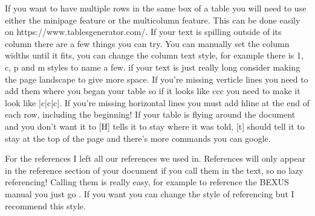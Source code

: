 %

If you want to have multiple rows in the same box of a table you will need to use either the minipage feature or the multicolumn feature. This can be done easily on  https://www.tablesgenerator.com/. If your text is spilling outside of its column there are a few things you can try. You can manually set the column widths until it fits, you can change the column text style, for example there is 1, c, p and m styles to name a few. if your text is just really long consider making the page landscape to give more space. If you're missing verticle lines you need to add them where you began your table so if it looks like {ccc} you need to make it look like {|c|c|c|}. If you're missing horizontal lines you must add hline at the end of each row, including the beginning! If your table is flying around the document and you don't want it to [H] tells it to stay where it was told, [t] should tell it to stay at the top of the page and there's more commands you can google. 

For the references I left all our references we used in. References will only appear in the reference section of your document if you call them in the text, so no lazy referencing! Calling them is really easy, for example to reference the BEXUS manual you just go \cite{BexusManual}. If you want you can change the style of referencing but I recommend this style.

